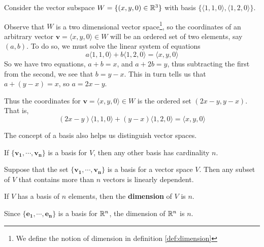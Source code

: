     \begin{example}
    Consider the vector subspace $W = \{(x, y, 0) \in \mathbb{R}^3 \}$ with basis $\{\langle1,1,0\rangle,\langle1,2,0\rangle\}$.
    
    Observe that $W$ is a two dimensional vector space\footnote{We define the notion of dimension in definition \ref{def:dimension}}, so the coordinates of an arbitrary vector $\bm{v} = \langle x, y,0 \rangle \in W$ will be an ordered set of two elements, say $(a,b)$.  To do so, we must solve the linear system of equations 
    $$a\langle1,1,0\rangle  + b\langle1,2,0\rangle  = \langle x,y,0\rangle $$
    So we have two equations, $a + b = x$, and $a+2b=y$, thus subtracting the first from the second, we see that $b = y-x$.  This in turn tells us that $a + (y-x) =x$, so $a = 2x-y$.
    
    Thus the coordinates for $\bm{v} = \langle x, y,0 \rangle \in W$ is the ordered set $(2x-y, y-x)$.  That is, 
    $$(2x-y)\langle1,1,0\rangle  + (y-x) \langle1,2,0\rangle  = \langle x,y,0\rangle $$
    \end{example}
    
    
    
    
    
    
    
    
    
    
    
    The concept of a basis also helps us distinguish vector spaces.
    
    \begin{theorem}\label{thm:basis}
    If $\{\bm{v_1}, \cdots, \bm{v_n}\}$ is a basis for $V$, then any other basis has cardinality $n$.
    \end{theorem}
    
    \begin{lemma}
    Suppose that the set $\{\bm{v_1}, \cdots, \bm{v_n}\}$ is a basis for a vector space $V$.  Then any subset of $V$ that contains more than $n$ vectors is linearly dependent.
    \end{lemma}
    
    
    \begin{definition}\label{def:dimension}
    If $V$ has a basis of $n$ elements, then the \textbf{dimension} of $V$ is $n$.
    \end{definition}
    
    \begin{example}\label{dimrn}
    Since $\{\bm{e_1}, \cdots, \bm{e_n}\}$ is a basis for $\mathbb{R}^n$, the dimension of $\mathbb{R}^n$ is $n$.
    \end{example}

